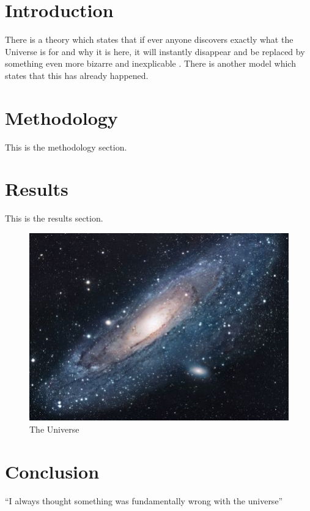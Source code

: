 \section{Introduction}
There is a theory which states that if ever anyone discovers exactly what the Universe is for and why it is here, it will instantly disappear and be replaced by something even more bizarre and inexplicable \cite{databaseII}.
There is another model which states that this has already happened.

\section{Methodology}
This is the methodology section.

\section{Results}
This is the results section.

\begin{figure}[h!]
    \centering
    \includegraphics[scale=1.7]{src/assets/images/universe}
    \caption{The Universe}
    \label{fig:universe}
\end{figure}

\section{Conclusion}
``I always thought something was fundamentally wrong with the universe'' \citep{adams1995hitchhiker}
